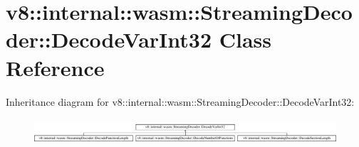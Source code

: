 \hypertarget{classv8_1_1internal_1_1wasm_1_1StreamingDecoder_1_1DecodeVarInt32}{}\section{v8\+:\+:internal\+:\+:wasm\+:\+:Streaming\+Decoder\+:\+:Decode\+Var\+Int32 Class Reference}
\label{classv8_1_1internal_1_1wasm_1_1StreamingDecoder_1_1DecodeVarInt32}
Inheritance diagram for v8\+:\+:internal\+:\+:wasm\+:\+:Streaming\+Decoder\+:\+:Decode\+Var\+Int32\+:\begin{figure}[H]
\begin{center}
\leavevmode
\includegraphics[height=0.949958cm]{classv8_1_1internal_1_1wasm_1_1StreamingDecoder_1_1DecodeVarInt32}
\end{center}
\end{figure}
